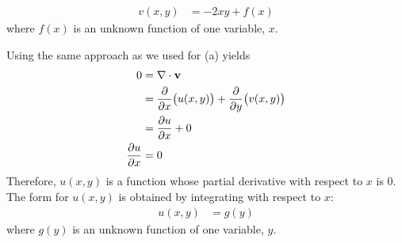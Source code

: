 \documentclass{article}
\begin{document}
\begin{align*}
 v(x,y) &= -2xy + f(x)
\end{align*}
where $f(x)$ is an unknown function of one variable, $x$. 
\item Using the same approach as we used for (a) yields
\begin{align*}
  0&= \nabla \cdot \mathbf{v} \\
  &= \frac{\partial}{\partial x} \big(u(x,y)\big) + \frac{\partial}{\partial y} \big(v(x,y)\big) \\
  &=  \frac{\partial u}{\partial x}+ 0\\
   \frac{\partial u}{\partial x} &= 0
\end{align*}
Therefore, $u(x,y)$ is a function whose partial derivative with respect to $x$ is $0$. The  form for $u(x,y)$ is obtained by integrating with respect to $x$:
\begin{align*}
 u(x,y) &= g(y)
\end{align*}
where $g(y)$ is an unknown function of one variable, $y$. 
\EEN

\EEN %
\end{document}
